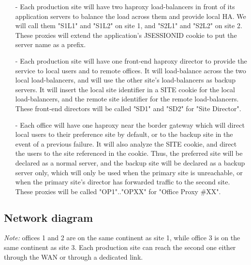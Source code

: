 \begin{itemize}
\item[-] Each production site will have two haproxy load-balancers in front of its
    application servers to balance the load across them and provide local HA.
    We will call them "S1L1" and "S1L2" on site 1, and "S2L1" and "S2L2" on
    site 2. These proxies will extend the application's JSESSIONID cookie to
    put the server name as a prefix.

\item[-] Each production site will have one front-end haproxy director to provide
    the service to local users and to remote offices. It will load-balance
    across the two local load-balancers, and will use the other site's
    load-balancers as backup servers. It will insert the local site identifier
    in a SITE cookie for the local load-balancers, and the remote site
    identifier for the remote load-balancers. These front-end directors will
    be called "SD1" and "SD2" for "Site Director".

\item[-] Each office will have one haproxy near the border gateway which will direct
    local users to their preference site by default, or to the backup site in
    the event of a previous failure. It will also analyze the SITE cookie, and
    direct the users to the site referenced in the cookie. Thus, the preferred
    site will be declared as a normal server, and the backup site will be
    declared as a backup server only, which will only be used when the primary
    site is unreachable, or when the primary site's director has forwarded
    traffic to the second site. These proxies will be called "OP1".."OPXX"
    for "Office Proxy \#XX".
\end{itemize}
  
\subsection{Network diagram}

\emph{Note:} offices 1 and 2 are on the same continent as site 1, while
       office 3 is on the same continent as site 3. Each production
       site can reach the second one either through the WAN or through
       a dedicated link.

